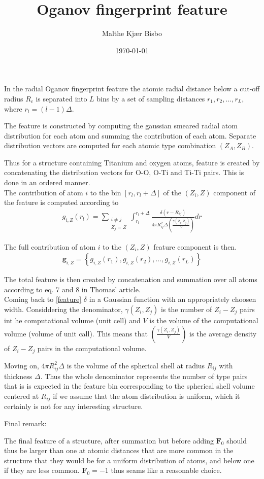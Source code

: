 \documentclass[english,a4paper,oneside, onecolumn,article,9pt]{memoir}
\title{Oganov fingerprint feature}
\author{Malthe Kjær Bisbo}
\date{\today}
\newcommand{\mb}[1]{\mathbf{#1}}
\begin{document}
\thispagestyle{empty}
\maketitle

In the radial Oganov fingerprint feature the atomic radial distance below a cut-off radius $R_c$ is separated into $L$ bins by a set of sampling distances ${r_1, r_2,...,r_L}$, where $r_l = (l-1)\Delta$.

The feature is constructed by computing the gaussian smeared radial atom distribution for each atom and summing the contribution of each atom. Separate distribution vectors are computed for each atomic type combination $(Z_A, Z_B)$. 

Thus for a structure containing Titanium and oxygen atoms, feature is created by concatenating the distribution vectors for O-O, O-Ti and Ti-Ti pairs. This is done in an ordered manner. \\

The contribution of atom $i$ to the bin $[r_l, r_l+\Delta]$ of the $(Z_i, Z)$ component of the feature is computed according to 
\begin{align}
g_{i,Z}(r_l) = \sum_{\substack{i\neq j \\ Z_j=Z}}\int_{r_l}^{r_l+\Delta} \frac{\delta(r-R_{ij})}{4\pi R_{ij}^2\Delta \left(\frac{\gamma(Z_i,Z_j)}{V}\right)}dr
\label{feature}
\end{align}

The full contribution of atom $i$ to the $(Z_i, Z)$ feature component is then.
\begin{align}
\mb{g}_{i,Z} = \left\{g_{i,Z}(r_1), g_{i,Z}(r_2), ... , g_{i,Z}(r_L)\right\}
\end{align}

The total feature is then created by concatenation and summation over all atoms according to eq. 7 and 8 in Thomas' article. \\

Coming back to \ref{feature} $\delta$ in a Gaussian function with an appropriately choosen width. Considdering the denominator, $\gamma(Z_i,Z_j)$ is the number of $Z_i-Z_j$ pairs int he computational volume (unit cell) and $V$ is the volume of the computational volume (volume of unit call). This means that $\left(\frac{\gamma(Z_i,Z_j)}{V}\right)$ is the average density of $Z_i-Z_j$ pairs in the computational volume.

Moving on,  $4\pi R_{ij}^2\Delta$ is the volume of the spherical shell at radius $R_{ij}$ with thickness $\Delta$. Thus the whole denominator represents the number of type pairs that is is expected in the feature bin corresponding to the spherical shell volume centered at $R_{ij}$ if we assume that the atom distribution is uniform, which it certainly is not for any interesting structure.

Final remark:

The final feature of a structure, after summation but before adding $\mb{F}_0$ should thus be larger than one at atomic distances that are more common in the structure that they would be for a uniform distribution of atoms, and below one if they are less common.
$\mb{F}_0 = -1$ thus seams like a reasonable choice.
\end{document}
